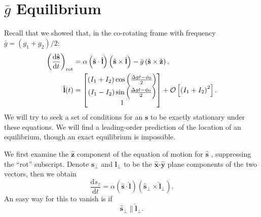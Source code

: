 \documentclass[11pt,
        usenames, %
        dvipsnames %
    ]{article}
\newcommand*{\rd}[2]{\frac{\mathrm{d}#1}{\mathrm{d}#2}}
\newcommand*{\bm}[1]{\boldsymbol{\mathbf{#1}}}
\newcommand*{\uv}[1]{\hat{\bm{#1}}}
\newcommand*{\p}[1]{\left(#1\right)}
\newcommand*{\s}[1]{\left[#1\right]}
\begin{document}
\section{$\bar{g}$ Equilibrium}

Recall that we showed that, in the co-rotating frame with frequency $\bar{g} =
\p{g_1 + g_2} / 2$:
\begin{align}
    \p{\rd{\uv{s}}{t}}_{\rm rot}
        &= \alpha\p{\uv{s} \cdot \uv{l}}\p{\uv{s} \times \uv{l}}
            - \bar{g}\p{\uv{s} \times \uv{z}}\label{eq:eom_rot},\\
    \uv{l}(t) &= \begin{bmatrix}
        \p{I_1 + I_2}\cos \p{\frac{\Delta gt - \phi_0}{2}}\\
        \p{I_1 - I_2}\sin \p{\frac{\Delta gt - \phi_0}{2}}\\
        1
    \end{bmatrix} + \mathcal{O}\s{\p{I_1 + I_2}^2}.
\end{align}
We will try to seek a set of conditions for an $\bm{s}$ to be exactly stationary
under these equations. We will find a leading-order prediction of the location
of an equilibrium, though an exact equilibrium is impossible.

We first examine the $\uv{z}$ component of the equation of motion for $\uv{s}$ ,
suppressing the ``rot'' subscript. Denote $\bm{s}_{\perp}$ and $\bm{l}_{\perp}$
to be the $\uv{x}$-$\uv{y}$ plane components of the two vectors, then we obtain
\begin{equation}
    \rd{s_z}{t} = \alpha\p{\uv{s} \cdot \uv{l}}\p{\uv{s}_{\perp} \times
            \uv{l}_{\perp}}.
\end{equation}
An easy way for this to vanish is if
\begin{equation}
    \uv{s}_\perp \parallel \uv{l}_\perp\label{eq:parallel_cons}.
\end{equation}
\end{document}

